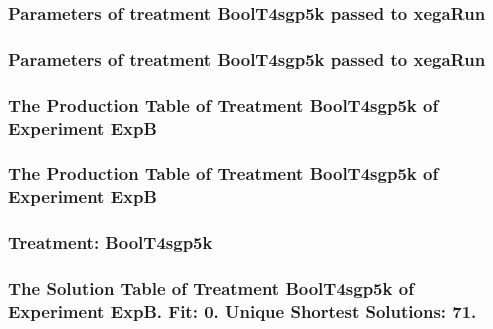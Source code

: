 \documentclass[18pt,c]{beamer}
\begin{document}

 \begin{frame}
 \fontsize{8pt}{9pt}\selectfont
 \frametitle{  Parameters of treatment BoolT4sgp5k passed to xegaRun
 }

 \label{ExpBtParmTable094.tex}  
 \end{frame}


 \begin{frame}
 \fontsize{8pt}{9pt}\selectfont
 \frametitle{  Parameters of treatment BoolT4sgp5k passed to xegaRun
 }

 \label{ExpBtParmTable095.tex}  
 \end{frame}

 \begin{frame}
 \fontsize{8pt}{9pt}\selectfont
 \frametitle{ The Production Table of Treatment BoolT4sgp5k of Experiment ExpB }

 \label{ExpBGrammarTable030.tex}  
 \end{frame}

 \begin{frame}
 \fontsize{8pt}{9pt}\selectfont
 \frametitle{ The Production Table of Treatment BoolT4sgp5k of Experiment ExpB }

 \label{ExpBGrammarTable031.tex}  
 \end{frame}

 \begin{frame}
 \fontsize{8pt}{9pt}\selectfont
 \frametitle{ Treatment: BoolT4sgp5k }

 \label{ExpBStatsTable030.tex}  
 \end{frame}

 \begin{frame}
 \fontsize{8pt}{9pt}\selectfont
 \frametitle{ The Solution Table of Treatment BoolT4sgp5k of Experiment ExpB. Fit: 0. Unique Shortest Solutions: 71. }

 \label{ExpBSolutionTable023.tex}  
 \end{frame}
\end{document}
